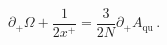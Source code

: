 \begin{equation}
\partial_+ \Omega + \frac{1}{2x^+} = \frac{3}{2N} \partial_+
A_{\text{qu}}\, .
\end{equation}

